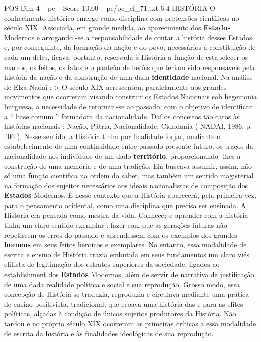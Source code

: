 \begin{textsample}{POS Dim 4 – pe – Score 10.00 – pe/pe\_ef\_71.txt}  \label{ex:f4_pos_274}
6.4 HISTÓRIA O conhecimento histórico emerge como disciplina com pretensões científicas no século XIX.
Associada, em grande medida, ao aparecimento dos \textbf{Estados} Modernos e arrogando -se a responsabilidade de contar a história desses Estados e, por conseguinte, da formação da nação e do povo, necessários à constituição de cada um deles, ficava, portanto, reservada à História a função de estabelecer os marcos, os feitos, os fatos e o panteão de heróis que teriam sido responsáveis pela história da nação e da construção de uma dada \textbf{identidade} nacional.
Na análise de Elza Nadai : > O século XIX acrescentou, paralelamente aos grandes movimentos que ocorreram visando construir os Estados Nacionais sob hegemonia burguesa, a necessidade de retornar -se ao passado, com o objetivo de identificar a “ base comum ” formadora da nacionalidade.
Daí os conceitos tão caros às histórias nacionais : Nação, Pátria, Nacionalidade, Cidadania ( NADAI, 1986, p. 106 ).
Nesse sentido, a História tinha por finalidade forjar, mediante o estabelecimento de uma continuidade entre passado-presente-futuro, os traços da nacionalidade nos indivíduos de um dado \textbf{território}, proporcionando -lhes a construção de uma memória e de uma tradição.
Ela buscava assumir, assim, não só uma função científica na ordem do saber, mas também um sentido magisterial na formação dos sujeitos necessários aos ideais nacionalistas de composição dos \textbf{Estados} Modernos.
É nesse contexto que a História aparecerá, pela primeira vez, para o pensamento ocidental, como uma disciplina que precisa ser ensinada.
A História era pensada como mestra da vida.
Conhecer e aprender com a história tinha um claro sentido exemplar : fazer com que as gerações futuras não repetissem os erros do passado e aprendessem com os exemplos dos grandes \textbf{homens} em seus feitos heroicos e exemplares.
No entanto, essa modalidade de escrita e ensino de História trazia embutida em seus fundamentos um claro viés elitista de legitimação dos estratos superiores da sociedade, ligados ao establishment dos \textbf{Estados} Modernos, além de servir de narrativa de justificação de uma dada realidade política e social e sua reprodução.
Grosso modo, essa concepção de História se traduzia, reproduzia e circulava mediante uma prática de ensino positivista, tradicional, que ecoava uma história das e para as elites políticas, alçadas à condição de únicos sujeitos produtores da História.
Não tardou e no próprio século XIX ocorreram as primeiras críticas a essa modalidade de escrita da história e às finalidades ideológicas de sua reprodução.

\end{textsample}
